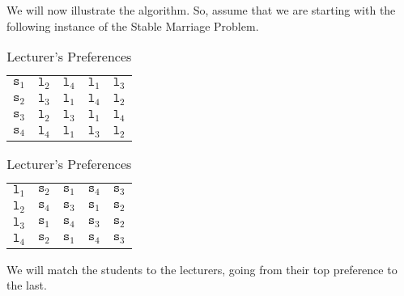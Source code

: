 \documentclass[a4paper, openany]{memoir}
\begin{document}
    We will now illustrate the algorithm. So, assume that we are starting with the following instance of the Stable Marriage Problem.
    \begin{table}[H]
        \centering
        \begin{subtable}{0.45\textwidth}
            \centering
            \begin{tabular}{c|cccc}
                $\texttt{s}_1$ & $\texttt{l}_2$ & $\texttt{l}_4$ & $\texttt{l}_1$ & $\texttt{l}_3$ \\
                $\texttt{s}_2$ & $\texttt{l}_3$ & $\texttt{l}_1$ & $\texttt{l}_4$ & $\texttt{l}_2$ \\
                $\texttt{s}_3$ & $\texttt{l}_2$ & $\texttt{l}_3$ & $\texttt{l}_1$ & $\texttt{l}_4$ \\
                $\texttt{s}_4$ & $\texttt{l}_4$ & $\texttt{l}_1$ & $\texttt{l}_3$ & $\texttt{l}_2$
            \end{tabular}
            \caption{Student's Preferences}
        \end{subtable}
        \hfill
        \begin{subtable}{0.45\textwidth}
            \centering
            \begin{tabular}{c|cccc}
                $\texttt{l}_1$ & $\texttt{s}_2$ & $\texttt{s}_1$ & $\texttt{s}_4$ & $\texttt{s}_3$ \\
                $\texttt{l}_2$ & $\texttt{s}_4$ & $\texttt{s}_3$ & $\texttt{s}_1$ & $\texttt{s}_2$ \\
                $\texttt{l}_3$ & $\texttt{s}_1$ & $\texttt{s}_4$ & $\texttt{s}_3$ & $\texttt{s}_2$ \\
                $\texttt{l}_4$ & $\texttt{s}_2$ & $\texttt{s}_1$ & $\texttt{s}_4$ & $\texttt{s}_3$
            \end{tabular}
            \caption{Lecturer's Preferences}
        \end{subtable}
    \end{table}
    \noindent We will match the students to the lecturers, going from their top preference to the last. 
\end{document}
